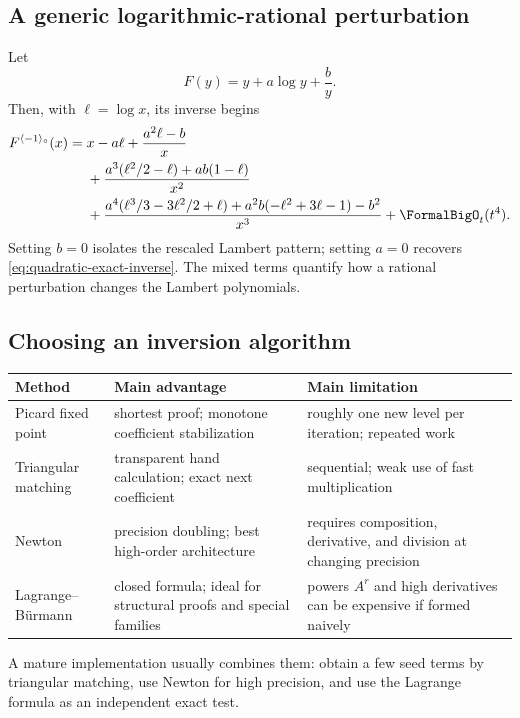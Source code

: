 \documentclass[11pt,oneside]{article}
\numberwithin{equation}{section}
\theoremstyle{definition}
\newcommand{\rev}{\langle-1\rangle_{\circ}}
\begin{document}
\subsection{A generic logarithmic-rational perturbation}

Let
\begin{equation}\label{eq:generic-ab-map}
  F(y)=y+a\log y+\frac{b}{y}.
\end{equation}
Then, with \(\ell=\log x\), its inverse begins
\begin{align}
 F^{\rev}(x)={}&x-a\ell
 +\frac{a^2\ell-b}{x}\nonumber\\
 &+\frac{a^3(\ell^2/2-\ell)+ab(1-\ell)}{x^2}\nonumber\\
 &+\frac{a^4(\ell^3/3-3\ell^2/2+\ell)
          +a^2b(-\ell^2+3\ell-1)-b^2}{x^3}
 +\FormalBigO_t(t^4).
 \label{eq:generic-ab-inverse}
\end{align}
Setting \(b=0\) isolates the rescaled Lambert pattern; setting \(a=0\)
recovers \eqref{eq:quadratic-exact-inverse}.  The mixed terms quantify how a
rational perturbation changes the Lambert polynomials.

\subsection{Choosing an inversion algorithm}

\begin{center}
\begin{tabularx}{0.97\textwidth}{@{}p{}p{}X@{}}
\toprule
Method & Main advantage & Main limitation\\
\midrule
Picard fixed point & shortest proof; monotone coefficient stabilization & roughly one new level per iteration; repeated work\\
Triangular matching & transparent hand calculation; exact next coefficient & sequential; weak use of fast multiplication\\
Newton & precision doubling; best high-order architecture & requires composition, derivative, and division at changing precision\\
Lagrange--B\"urmann & closed formula; ideal for structural proofs and special families & powers \(A^r\) and high derivatives can be expensive if formed naively\\
\bottomrule
\end{tabularx}
\end{center}

A mature implementation usually combines them: obtain a few seed terms by
triangular matching, use Newton for high precision, and use the Lagrange formula
as an independent exact test.
\end{document}
